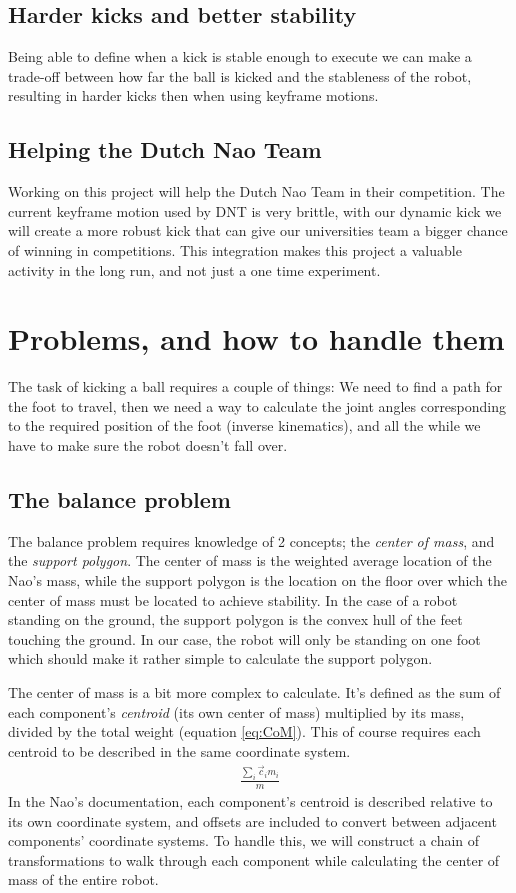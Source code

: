 \documentclass[a4paper]{article}
\begin{document}
\subsection{Harder kicks and better stability}
Being able to define when a kick is stable enough to execute we can make a
trade-off between how far the ball is kicked and the stableness of the
robot, resulting in harder kicks then when using keyframe motions.

\subsection{Helping the Dutch Nao Team}
 Working on this project will help the Dutch Nao Team in their competition. The
current keyframe motion used by DNT is very brittle, with our dynamic kick we will create a
more robust kick that can give our universities team a bigger chance of
winning in competitions. 
This integration makes this project a valuable activity in the long run, and not
just a one time experiment.

\section{Problems, and how to handle them}
The task of kicking a ball requires a couple of things: We need to find a path
for the foot to travel, then we need a way to calculate the joint angles
corresponding to the required position of the foot (inverse kinematics), and all
the while we have to make sure the robot doesn't fall over.

\subsection{The balance problem}
The balance problem requires knowledge of 2 concepts; the \emph{center of mass},
and the \emph{support polygon}. The center of mass is the weighted average
location of the Nao’s mass, while the support polygon is the location on the
floor over which the center of mass must be located to achieve stability. In the
case of a robot standing on the ground, the support polygon is the convex hull
of the feet touching the ground. In our case, the robot will only be standing on
one foot which should make it rather simple to calculate the support polygon. 

The center of mass is a bit more complex to calculate. It's defined as the sum
of each component’s \emph{centroid} (its own center of mass) multiplied by its
mass, divided by the total weight (equation \ref{eq:CoM}). This of course
requires each centroid to be described in the same coordinate system.
\begin{align}
  \frac{\sum_i \vec{c}_i m_i} {m}        \label{eq:CoM}
\end{align}
In the Nao’s documentation, each component’s centroid is described relative to
its own coordinate system, and offsets are included to convert between adjacent
components’ coordinate systems. To handle this, we will construct a chain of
transformations to walk through each component while calculating the center of
mass of the entire robot.
\end{document}
